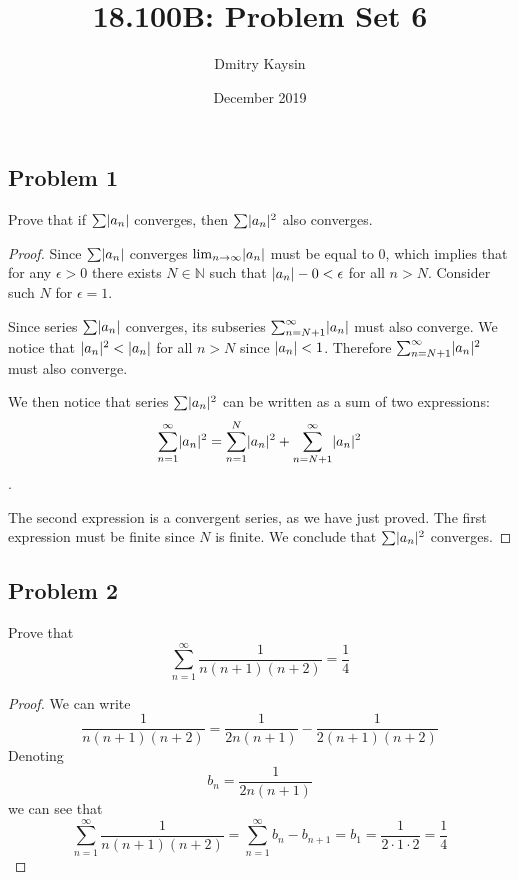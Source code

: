 \documentclass{article}
\title{18.100B: Problem Set 6}
\author{Dmitry Kaysin}
\date{December 2019}
\newcommand{\N}{\mathbb{N}}
\DeclarePairedDelimiter{\abs}{\lvert}{\rvert}
\theoremstyle{remark}
\begin{document}
\maketitle 


\subsection*{Problem 1}

\begin{tcolorbox}
Prove that if $\sum \abs{a_n}$ converges, then $\sum \abs{a_n}^2$ also converges.
\end{tcolorbox}

\begin{proof}

Since  $\sum \abs{a_n}$ converges $\lim_{n \to \infty} \abs{a_n}$ must be equal to $0$, which implies that for any $\epsilon>0$ there exists $N \in \N$ such that $\abs{a_n} - 0 < \epsilon$ for all $n > N$.
Consider such $N$ for $\epsilon = 1$.

Since series $\sum \abs{a_n}$ converges, its subseries $\sum_{n=N+1}^{\infty}\abs{a_n}$ must also converge.
We notice that $\abs{a_n}^2 < \abs{a_n}$ for all $n>N$ since $\abs{a_n} < 1$. Therefore $\sum_{n=N+1}^{\infty}\abs{a_n}^2$ must also converge.

We then notice that series $\sum \abs{a_n}^2$ can be written as a sum of two expressions: 
$$ \sum_{n=1}^{\infty} \abs{a_n}^2 = \sum_{n=1}^{N} \abs{a_n}^2 + \sum_{n=N+1}^{\infty} \abs{a_n}^2 $$.

The second expression is a convergent series, as we have just proved. The first expression must be finite since $N$ is finite. We conclude that $\sum \abs{a_n}^2$ converges.

\end{proof}


\subsection*{Problem 2}

\begin{tcolorbox}
Prove that 
$$ \sum_{n=1}^{\infty} \frac{1}{n(n+1)(n+2)} = \frac{1}{4} $$
\end{tcolorbox}

\begin{proof}

We can write 
\[ \frac{1}{n(n+1)(n+2)} = \frac{1}{2n(n+1)}-\frac{1}{2(n+1)(n+2)} \]
Denoting 
\[ b_n = \frac{1}{2n(n+1)} \]
we can see that
\[ \sum_{n=1}^{\infty} \frac{1}{n(n+1)(n+2)} =  \sum_{n=1}^{\infty} b_n - b_{n+1} = b_1 = \frac{1}{2 \cdot 1 \cdot 2} = \frac{1}{4} \]

\end{proof}
\end{document}
